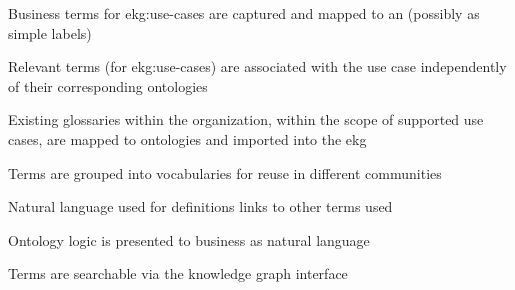 \ekgmmscoringlevelOne

\begin{scoring}

  \item Business terms for \glspl{ekg:use-case} are captured and mapped to an 
        (possibly as simple labels)


\end{scoring}

\ekgmmscoringlevelTwo

\begin{scoring}

  \item Relevant terms (for \glspl{ekg:use-case}) are associated with the use case independently of
  their corresponding ontologies


\end{scoring}

\ekgmmscoringlevelThree

\begin{scoring}

  \item Existing glossaries within the organization, within the scope of supported use cases,
        are mapped to ontologies and imported into the \gls{ekg}
  \item Terms are grouped into vocabularies for reuse in different communities
  \item Natural language used for definitions links to other terms used
  \item Ontology logic is presented to business as natural language
  \item Terms are searchable via the knowledge graph interface


\end{scoring}

